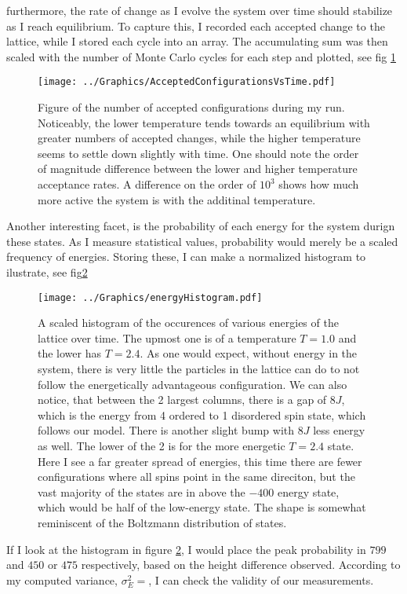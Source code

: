 \documentclass[10pt, twocolumn]{revtex4-1}
\begin{document}
furthermore, the rate of change as I evolve the system over time should stabilize as I reach equilibrium. To capture this, I recorded each accepted change
to the lattice, while I stored each cycle into an array. The accumulating sum was then scaled with the number of Monte Carlo cycles for each step and plotted,
see fig \ref{fig:Accepted}
\begin{figure}[hbtp]
    \texttt{[image: ../Graphics/AcceptedConfigurationsVsTime.pdf]}
    \caption{Figure of the number of accepted configurations during my run. Noticeably, the lower temperature tends towards an equilibrium with greater
    numbers of accepted changes, while the higher temperature seems to settle down slightly with time. One should note the order of magnitude difference
    between the lower and higher temperature acceptance rates. A difference on the order of $10^3$ shows how much more active the system is with the
    additinal temperature.}
\label{fig:Accepted}
\end{figure}


Another interesting facet, is the probability of each energy for the system durign these states. As I measure statistical values, probability would merely
be a scaled frequency of energies. Storing these, I can make a normalized histogram to ilustrate, see fig\ref{fig:PrEhist}
\begin{figure}[hbtp]
    \texttt{[image: ../Graphics/energyHistogram.pdf]}
    \caption{A scaled histogram of the occurences of various energies of the lattice over time. The upmost one is of a temperature $T=1.0$ and the lower
    has $T=2.4$. As one would expect, without energy in the system, there is very little the particles in the lattice can do to not follow the energetically
    advantageous configuration. We can also notice, that between the 2 largest columns, there is a gap of $8J$, which is the energy from 4 ordered to 1
    disordered spin state, which follows our model. There is another slight bump with $8J$ less energy as well. The lower of the 2 is for the more energetic
    $T=2.4$ state. Here I see a far greater spread of energies, this time there are fewer configurations where all spins point in the same direciton, but the
    vast majority of the states are in above the $-400$ energy state, which would be half of the low-energy state. The shape is somewhat reminiscent of the
    Boltzmann distribution of states.}
\label{fig:PrEhist}
\end{figure}
If I look at the histogram in figure \ref{fig:PrEhist}, I would place the peak probability in $799$ and $450$ or $475$ respectively, based on the height
difference observed. According to my computed variance, $\sigma_E^2=$, I can check the validity of our measurements.
\end{document}
